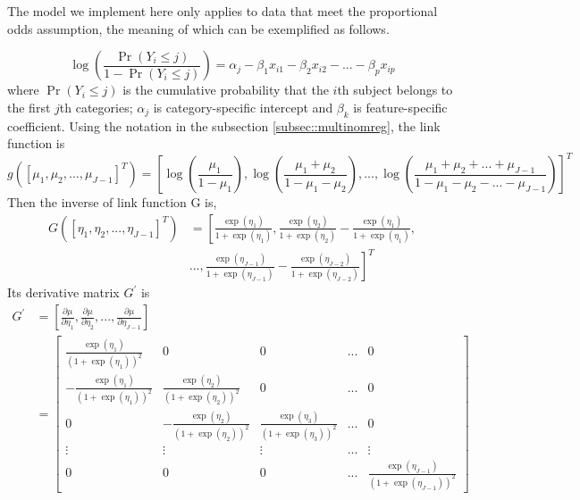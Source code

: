 The model we implement here only applies to data that meet the proportional odds assumption, the meaning of which can be exemplified as follows.

\[
\log\left( \frac{\Pr(Y_i \le j)}{1-\Pr(Y_i \le j)} \right) = \alpha_j - \beta_1 x_{i1} - \beta_2 x_{i2} - ... - \beta_p x_{ip}
\]
where $\Pr(Y_i \le j)$ is the cumulative probability that the $i$th subject belongs to the first $j$th categories; $\alpha_j$ is category-specific intercept and $\beta_k$ is feature-specific coefficient. Using the notation in the subsection \ref{subsec::multinomreg}, the link function is
\[
g\left([\mu_1, \mu_2, ..., \mu_{J-1}]^T\right) = \left[\log\left(\frac{\mu_1}{1-\mu_1}\right), \log\left(\frac{\mu_1+\mu_2}{1-\mu_1-\mu_2}\right), ..., \log\left(\frac{\mu_1+\mu_2+...+\mu_{J-1}}{1-\mu_1-\mu_2-...-\mu_{J-1}}\right)\right]^T
\] 
Then the inverse of link function G is,
\begin{align*}
G\left([\eta_1, \eta_2, ..., \eta_{J-1}]^T\right) & = \left[\frac{\exp(\eta_1)}{1+\exp(\eta_1)}, \frac{\exp(\eta_2)}{1+\exp(\eta_2)} - \frac{\exp(\eta_1)}{1+\exp(\eta_1)},\right. \\
						  &    \left. ..., \frac{\exp(\eta_{J-1})}{1+\exp(\eta_{J-1})} - \frac{\exp(\eta_{J-2})}{1+\exp(\eta_{J-2})}\right]^T
\end{align*}
Its derivative matrix $G^\prime$ is
\begin{align*}
G^\prime & = \left[\frac{\partial \mu}{\partial \eta_1}, \frac{\partial \mu}{\partial \eta_2}, ..., \frac{\partial \mu}{\partial \eta_{J-1}}\right] \\
& = \left[ \begin{array}{ccccc}
	      \frac{\exp(\eta_1)}{(1+\exp(\eta_1))^2} & 0 & 0 & ... & 0 \\
	     -\frac{\exp(\eta_1)}{(1+\exp(\eta_1))^2} & \frac{\exp(\eta_2)}{(1+\exp(\eta_2))^2} & 0 & ... & 0 \\
	     0 & -\frac{\exp(\eta_2)}{(1+\exp(\eta_2))^2} & \frac{\exp(\eta_3)}{(1+\exp(\eta_3))^2} & ... & 0 \\
	     \vdots & \vdots & \vdots & ... & \vdots \\
	     0 & 0 & 0 & ... & \frac{\exp(\eta_{J-1})}{(1+\exp(\eta_{J-1}))^2}
	   \end{array} \right]
\end{align*}

